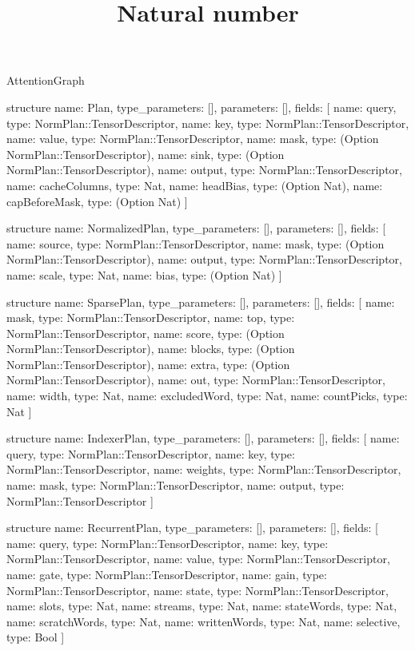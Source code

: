 \begin{lexlean}{AttentionGraph}
\title{Natural number}
\begin{semanticmodule}
structure{
  name: Plan,
  type_parameters: [],
  parameters: [],
  fields: [
    {name: query, type: NormPlan::TensorDescriptor},
    {name: key, type: NormPlan::TensorDescriptor},
    {name: value, type: NormPlan::TensorDescriptor},
    {name: mask, type: (Option NormPlan::TensorDescriptor)},
    {name: sink, type: (Option NormPlan::TensorDescriptor)},
    {name: output, type: NormPlan::TensorDescriptor},
    {name: cacheColumns, type: Nat},
    {name: headBias, type: (Option Nat)},
    {name: capBeforeMask, type: (Option Nat)}
  ]
}

structure{
  name: NormalizedPlan,
  type_parameters: [],
  parameters: [],
  fields: [
    {name: source, type: NormPlan::TensorDescriptor},
    {name: mask, type: (Option NormPlan::TensorDescriptor)},
    {name: output, type: NormPlan::TensorDescriptor},
    {name: scale, type: Nat},
    {name: bias, type: (Option Nat)}
  ]
}

structure{
  name: SparsePlan,
  type_parameters: [],
  parameters: [],
  fields: [
    {name: mask, type: NormPlan::TensorDescriptor},
    {name: top, type: NormPlan::TensorDescriptor},
    {name: score, type: (Option NormPlan::TensorDescriptor)},
    {name: blocks, type: (Option NormPlan::TensorDescriptor)},
    {name: extra, type: (Option NormPlan::TensorDescriptor)},
    {name: out, type: NormPlan::TensorDescriptor},
    {name: width, type: Nat},
    {name: excludedWord, type: Nat},
    {name: countPicks, type: Nat}
  ]
}

structure{
  name: IndexerPlan,
  type_parameters: [],
  parameters: [],
  fields: [
    {name: query, type: NormPlan::TensorDescriptor},
    {name: key, type: NormPlan::TensorDescriptor},
    {name: weights, type: NormPlan::TensorDescriptor},
    {name: mask, type: NormPlan::TensorDescriptor},
    {name: output, type: NormPlan::TensorDescriptor}
  ]
}

structure{
  name: RecurrentPlan,
  type_parameters: [],
  parameters: [],
  fields: [
    {name: query, type: NormPlan::TensorDescriptor},
    {name: key, type: NormPlan::TensorDescriptor},
    {name: value, type: NormPlan::TensorDescriptor},
    {name: gate, type: NormPlan::TensorDescriptor},
    {name: gain, type: NormPlan::TensorDescriptor},
    {name: state, type: NormPlan::TensorDescriptor},
    {name: slots, type: Nat},
    {name: streams, type: Nat},
    {name: stateWords, type: Nat},
    {name: scratchWords, type: Nat},
    {name: writtenWords, type: Nat},
    {name: selective, type: Bool}
  ]
}


\end{semanticmodule}
\end{lexlean}

